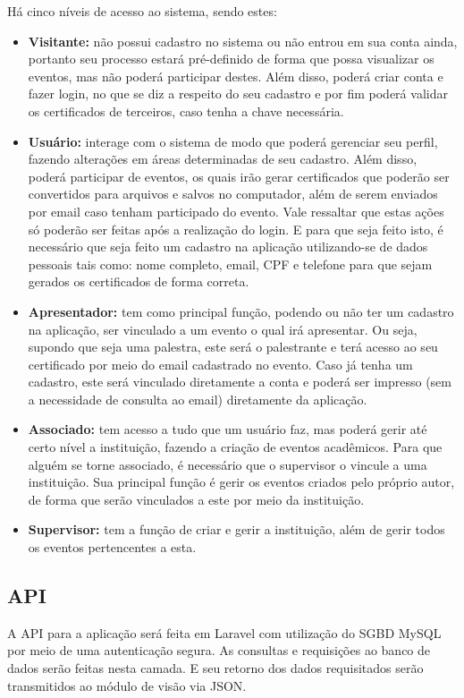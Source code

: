 Há cinco níveis de acesso ao sistema, sendo estes:
\begin{itemize}
    \item \textbf{Visitante: } não possui cadastro no sistema ou não entrou em sua conta ainda, portanto seu processo estará pré-definido de forma que possa visualizar os eventos, mas não poderá participar destes. Além disso, poderá criar conta e fazer login, no que se diz a respeito do seu cadastro e por fim poderá validar os certificados de terceiros, caso tenha a chave necessária.
    \item \textbf{Usuário: }interage com o sistema de modo que poderá gerenciar seu perfil, fazendo alterações em áreas determinadas de seu cadastro. Além disso, poderá participar de eventos, os quais irão gerar certificados que poderão ser convertidos para arquivos e salvos no computador, além de serem enviados por email caso tenham participado do evento. Vale ressaltar que estas ações só poderão ser feitas após a realização do login. E para que seja feito isto, é necessário que seja feito um cadastro na aplicação utilizando-se de dados pessoais tais como: nome completo, email, CPF e telefone para que sejam gerados os certificados de forma correta. 
    \item \textbf{Apresentador: }tem como principal função, podendo ou não ter um cadastro na aplicação, ser vinculado a um evento o qual irá apresentar. Ou seja, supondo que seja uma palestra, este será o palestrante e terá acesso ao seu certificado por meio do email cadastrado no evento. Caso já tenha um cadastro, este será vinculado diretamente a conta e poderá ser impresso (sem a necessidade de consulta ao email) diretamente da aplicação.
    \item \textbf{Associado: }tem acesso a tudo que um usuário faz, mas poderá gerir até certo nível a instituição, fazendo a criação de eventos acadêmicos. Para que alguém se torne associado, é necessário que o supervisor o vincule a uma instituição. Sua principal função é gerir os eventos criados pelo próprio autor, de forma que serão vinculados a este por meio da instituição.
    \item \textbf{Supervisor: }tem a função de criar e gerir a instituição, além de gerir todos os eventos pertencentes a esta.
\end{itemize}


\subsection{API}
A API para a aplicação será feita em Laravel com utilização do SGBD MySQL por meio de uma autenticação segura. As consultas e requisições ao banco de dados serão feitas nesta camada. E seu retorno dos dados requisitados serão transmitidos ao módulo de visão via JSON.

